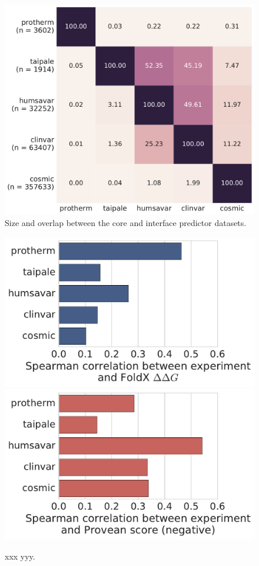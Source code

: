 
\begin{figure}[ht]
	\centering
	\includegraphics[width=1\textwidth]{figures/elaspic_training_set/core_data_statistics/training_set_overlap_final.pdf}
	\caption{Size and overlap between the core and interface predictor datasets.}
\end{figure}





\begin{figure}[ht]
	\centering
	\includegraphics[width=1\textwidth]{figures/elaspic_training_set/core_data_statistics/foldx_correlation_final.pdf}
	\includegraphics[width=1\textwidth]{figures/elaspic_training_set/core_data_statistics/provean_correlation_final.pdf}
	\caption{xxx yyy.}
\end{figure}
